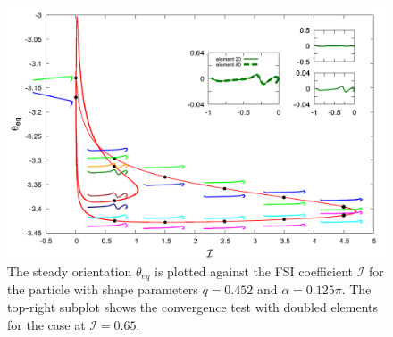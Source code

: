 \documentclass[a4paper,12pt]{report}
\begin{document}
\begin{figure}[!h]
	\begin{center}
		\includegraphics[width=1\textwidth]{plot/combine_elastic_beam_I_theta_q_0.452_alpha_0.125pi_initial_-4.80_0.png}
		\caption{The steady orientation $\theta_{eq}$ is plotted against the FSI coefficient $\mathcal{I}$ for the particle with shape parameters $q = 0.452$ and $\alpha = 0.125\pi$. The top-right subplot shows the convergence test with doubled elements for the case at $\mathcal{I}=0.65$.}
		\label{fig:12}
	\end{center}
\end{figure}
\end{document}
